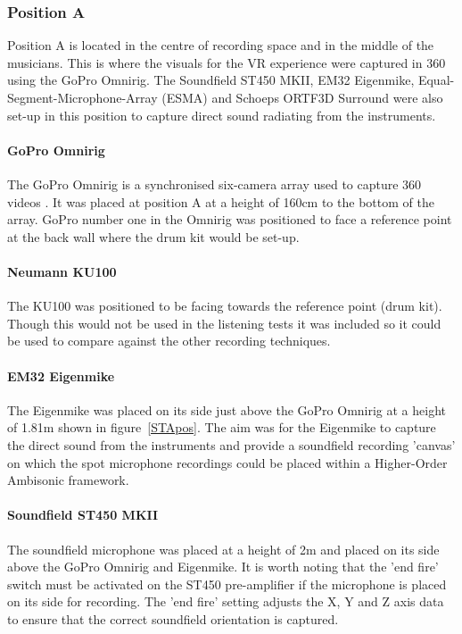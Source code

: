 
		\subsubsection{Position A}

			Position A is located in the centre of recording space and in the middle of the musicians. This is where the visuals for the VR experience were captured in 360\textdegree{} using the GoPro Omnirig. The Soundfield ST450 MKII, EM32 Eigenmike, Equal-Segment-Microphone-Array (ESMA) and Schoeps ORTF3D Surround were also set-up in this position to capture direct sound radiating from the instruments.\\

			\paragraph{GoPro Omnirig}
			The GoPro Omnirig is a synchronised six-camera array used to capture 360\textdegree{} videos \cite{gopro}. It was placed at position A at a height of 160cm to the bottom of the array. GoPro number one in the Omnirig was positioned to face a reference point at the back wall where the drum kit would be set-up.\\

			\paragraph{Neumann KU100}
			The KU100 was positioned to be facing towards the reference point (drum kit). Though this would not be used in the listening tests  it was included so it could be used to compare against the other recording techniques.\\

			\paragraph{EM32 Eigenmike}
			The Eigenmike was placed on its side just above the GoPro Omnirig at a height of 1.81m shown in figure~\ref{STApos}. The aim was for the Eigenmike to capture the direct sound from the instruments and provide a soundfield recording 'canvas' on which the spot microphone recordings could be placed within a Higher-Order Ambisonic framework. \\

			\paragraph{Soundfield ST450 MKII}
			The soundfield microphone was placed at a height of 2m and placed on its side above the GoPro Omnirig and Eigenmike. It is worth noting that the 'end fire' switch must be activated on the ST450 pre-amplifier if the microphone is placed on its side for recording. The 'end fire' setting adjusts the X, Y and Z axis data to ensure that the correct soundfield orientation is captured.\\

